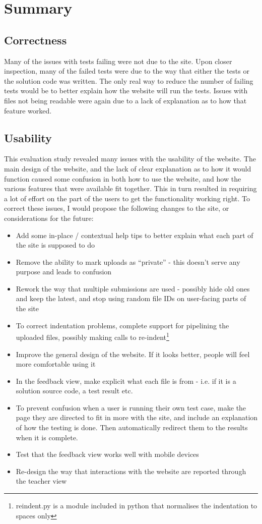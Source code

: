 \documentclass[a4paper,11pt]{report}
\begin{document}
\section{Summary}
\subsection{Correctness}
Many of the issues with tests failing were not due to the site. Upon closer inspection, many of the failed tests were due to the way that either the tests or the solution code was written. The only real way to reduce the number of failing tests would be to better explain how the website will run the tests. Issues with files not being readable were again due to a lack of explanation as to how that feature worked.
\subsection{Usability}
This evaluation study revealed many issues with the usability of the website. The main design of the website, and the lack of clear explanation as to how it would function caused some confusion in both how to use the website, and how the various features that were available fit together. This in turn resulted in requiring a lot of effort on the part of the users to get the functionality working right. To correct these issues, I would propose the following changes to the site, or considerations for the future:
\begin{itemize}
\item Add some in-place / contextual help tips to better explain what each part of the site is supposed to do
\item Remove the ability to mark uploads as ``private'' - this doesn't serve any purpose and leads to confusion
\item Rework the way that multiple submissions are used - possibly hide old ones and keep the latest, and stop using random file IDs on user-facing parts of the site
\item To correct indentation problems, complete support for pipelining the uploaded files, possibly making calls to re-indent\footnote{reindent.py is a module included in python that normalises the indentation to spaces only}
\item Improve the general design of the website. If it looks better, people will feel more comfortable using it
\item In the feedback view, make explicit what each file is from - i.e. if it is a solution source code, a test result etc.
\item To prevent confusion when a user is running their own test case, make the page they are directed to fit in more with the site, and include an explanation of how the testing is done. Then automatically redirect them to the results when it is complete.
\item Test that the feedback view works well with mobile devices
\item Re-design the way that interactions with the website are reported through the teacher view
\end{itemize}
\end{document}
